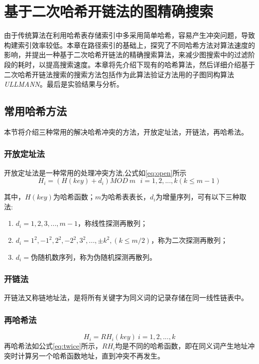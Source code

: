 \documentclass{XDBAthesis}
\numberwithin{algorithm}{chapter}
\begin{document}
\else
\fi
\chapter{基于二次哈希开链法的图精确搜索}
\label{chap:graphgrep}
由于传统算法在利用哈希表存储索引中多采用简单哈希，容易产生冲突问题，导致构建索引效率较低。本章在路径索引的基础上，探究了不同哈希方法对算法速度的影响，并提出一种基于二次哈希开链法的精确搜索算法，来减少图搜索中的过滤阶段的耗时，以提高搜索速度。本章将先介绍下现有的哈希算法，然后详细介绍基于二次哈希开链法搜索的搜索方法包括作为此算法验证方法用的子图同构算法\emph{ULLMANN}\cite{ullmann}。最后是实验结果与分析。

\section{常用哈希方法}
本节将介绍三种常用的解决哈希冲突的方法，开放定址法，开链法，再哈希法。

\subsection{开放定址法}
开放定址法\cite{datastruct}是一种常用的处理冲突方法,公式如\eqref{eq:open}所示
\begin{equation}
    H_i =(H(key)+d_i )MOD\ m\ \  \ i=1,2,...,k(k\leq m-1)
    \label{eq:open}
\end{equation}

其中，$H(key)$为哈希函数；$m$为哈希表表长，$d_i $为增量序列，可有以下三种取法:
\begin{enumerate}
    \item $d_i =1,2,3,...,m-1$，称线性探测再散列；
    \item $d_i =1^2 ,-1^2 ,2^2 ,-2^2 ,3^2 ,...,\pm k^2 ,(k\leq m/2 ) $，称为二次探测再散列；
    \item $d_i =$伪随机数序列，称为伪随机探测再散列。
\end{enumerate}
\subsection{开链法}
开链法又称链地址法\cite{datastruct}，是将所有关键字为同义词的记录存储在同一线性链表中。
\subsection{再哈希法}
\begin{equation}
    H_i =RH_i (key)\ i=1,2,...,k
    \label{eq:twice}
\end{equation}
再哈希法\cite{datastruct}如公式\eqref{eq:twice}所示，$RH_i $均是不同的哈希函数，即在同义词产生地址冲突时计算另一个哈希函数地址，直到冲突不再发生。
\end{document}
